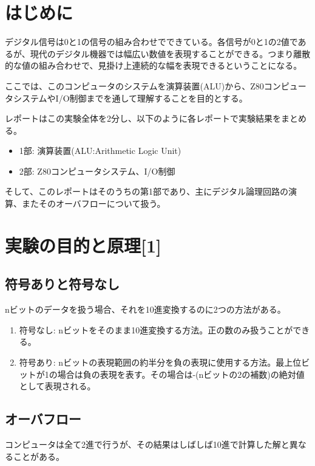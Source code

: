 \documentclass[11pt,a4j]{jsarticle}
\title{}
\author{1413176 三村幸祐}
\date{2016/12/14}
\begin{document}
  
  
  
  
 \section{はじめに}
  デジタル信号は0と1の信号の組み合わせでできている。各信号が0と1の2値であるが、現代のデジタル機器では幅広い数値を表現することができる。つまり離散的な値の組み合わせで、見掛け上連続的な幅を表現できるということになる。
  
  ここでは、このコンピュータのシステムを演算装置(ALU)から、Z80コンピュータシステムやI/O制御までを通して理解することを目的とする。
  
  レポートはこの実験全体を2分し、以下のように各レポートで実験結果をまとめる。
  \begin{itemize}
  \item 1部: 演算装置(ALU:Arithmetic Logic Unit)
  \item 2部: Z80コンピュータシステム、I/O制御
  \end{itemize}
  
  そして、このレポートはそのうちの第1部であり、主にデジタル論理回路の演算、またそのオーバフローについて扱う。
  
 \section{実験の目的と原理[1]}
  
  \subsection{符号ありと符号なし}
  nビットのデータを扱う場合、それを10進変換するのに2つの方法がある。
   \begin{enumerate}
   \item 符号なし: nビットをそのまま10進変換する方法。正の数のみ扱うことができる。
   \item 符号あり: nビットの表現範囲の約半分を負の表現に使用する方法。最上位ビットが1の場合は負の表現を表す。その場合は-(nビットの2の補数)の絶対値として表現される。
  \end{enumerate}
  
  \subsection{オーバフロー}
  コンピュータは全て2進で行うが、その結果はしばしば10進で計算した解と異なることがある。
  
\end{document}
